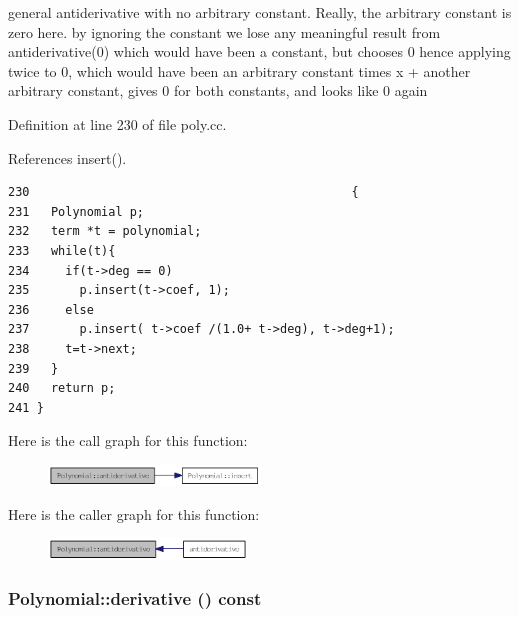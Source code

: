 general antiderivative with no arbitrary constant. Really, the arbitrary constant is zero here. by ignoring the constant we lose any meaningful result from antiderivative(0) which would have been a constant, but chooses 0 hence applying twice to 0, which would have been an arbitrary constant times x + another arbitrary constant, gives 0 for both constants, and looks like 0 again 

Definition at line 230 of file poly.cc.

References insert().

\begin{Code}\begin{verbatim}230                                             {
231   Polynomial p;
232   term *t = polynomial;
233   while(t){
234     if(t->deg == 0)
235       p.insert(t->coef, 1);
236     else
237       p.insert( t->coef /(1.0+ t->deg), t->deg+1);
238     t=t->next;
239   }
240   return p;
241 }
\end{verbatim}
\end{Code}




Here is the call graph for this function:\nopagebreak
\begin{figure}[H]
\begin{center}
\leavevmode
\includegraphics[width=160pt]{classPolynomial_4db9e4f680c52fb8af45f3ae985a4055_cgraph}
\end{center}
\end{figure}


Here is the caller graph for this function:\nopagebreak
\begin{figure}[H]
\begin{center}
\leavevmode
\includegraphics[width=150pt]{classPolynomial_4db9e4f680c52fb8af45f3ae985a4055_icgraph}
\end{center}
\end{figure}
\hypertarget{classPolynomial_aef1ed2dbc29d419c58c6d61b35853c3}{
\subsubsection[derivative]{ Polynomial::derivative () const}}
\label{classPolynomial_aef1ed2dbc29d419c58c6d61b35853c3}


